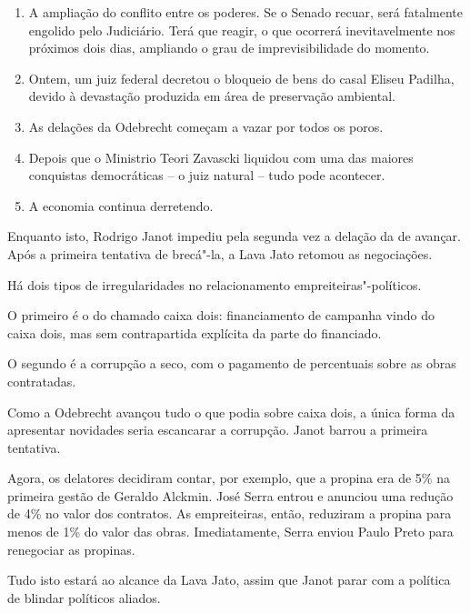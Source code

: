\begin{enumerate}
\itemsep1pt\parskip0pt
\item
  A ampliação do conflito entre os poderes. Se o Senado recuar, será
  fatalmente engolido pelo Judiciário. Terá que reagir, o que ocorrerá
  inevitavelmente nos próximos dois dias, ampliando o grau de
  imprevisibilidade do momento.
\item
  Ontem, um juiz federal decretou o bloqueio de bens do casal Eliseu
  Padilha, devido à devastação produzida em área de preservação
  ambiental.
\item
  As delações da Odebrecht começam a vazar por todos os poros.
\item
  Depois que o Ministrio Teori Zavascki liquidou com uma das maiores
  conquistas democráticas -- o juiz natural -- tudo pode acontecer.
\item
  A economia continua derretendo.
\end{enumerate}

Enquanto isto, Rodrigo Janot impediu pela segunda vez a delação da 
de avançar. Após a primeira tentativa de brecá"-la, a Lava Jato retomou
as negociações.

Há dois tipos de irregularidades no relacionamento
empreiteiras"-políticos.

O primeiro é o do chamado caixa dois: financiamento de campanha vindo do
caixa dois, mas sem contrapartida explícita da parte do financiado.

O segundo é a corrupção a seco, com o pagamento de percentuais sobre as
obras contratadas.

Como a Odebrecht avançou tudo o que podia sobre caixa dois, a única
forma da  apresentar novidades seria escancarar a corrupção. Janot
barrou a primeira tentativa.

Agora, os delatores decidiram contar, por exemplo, que a propina era de
5\% na primeira gestão de Geraldo Alckmin. José Serra entrou e anunciou
uma redução de 4\% no valor dos contratos. As empreiteiras, então,
reduziram a propina para menos de 1\% do valor das obras. Imediatamente,
Serra enviou Paulo Preto para renegociar as propinas.

Tudo isto estará ao alcance da Lava Jato, assim que Janot parar com a
política de blindar políticos aliados.
